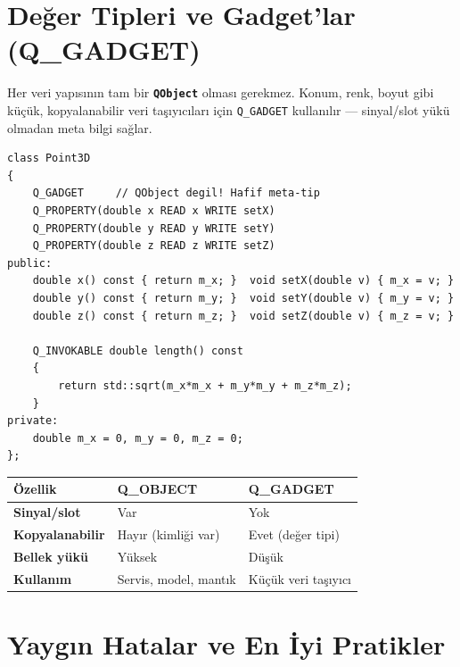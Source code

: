 \documentclass[11pt,a4paper]{article}
\newcommand{\kls}[1]{\texttt{\color{anaMavi}\textbf{#1}}}
\newcommand{\kod}[1]{\texttt{\color{koyuGri}#1}}
\begin{document}
\section{Değer Tipleri ve Gadget'lar (Q\_GADGET)}

Her veri yapısının tam bir \kls{QObject} olması gerekmez. Konum, renk, boyut
gibi küçük, kopyalanabilir veri taşıyıcıları için \kod{Q\_GADGET} kullanılır —
sinyal/slot yükü olmadan meta bilgi sağlar.

\begin{lstlisting}
class Point3D
{
    Q_GADGET     // QObject degil! Hafif meta-tip
    Q_PROPERTY(double x READ x WRITE setX)
    Q_PROPERTY(double y READ y WRITE setY)
    Q_PROPERTY(double z READ z WRITE setZ)
public:
    double x() const { return m_x; }  void setX(double v) { m_x = v; }
    double y() const { return m_y; }  void setY(double v) { m_y = v; }
    double z() const { return m_z; }  void setZ(double v) { m_z = v; }

    Q_INVOKABLE double length() const
    {
        return std::sqrt(m_x*m_x + m_y*m_y + m_z*m_z);
    }
private:
    double m_x = 0, m_y = 0, m_z = 0;
};
\end{lstlisting}

\begin{center}
\begin{tabularx}{\textwidth}{@{}>{\bfseries\color{anaMavi}}l >{\raggedright\arraybackslash}X >{\raggedright\arraybackslash}X@{}}
\toprule
\rowcolor{acikMavi}\color{anaMavi}\textbf{Özellik} & \color{anaMavi}\textbf{Q\_OBJECT} & \color{anaMavi}\textbf{Q\_GADGET} \\
\midrule
Sinyal/slot & Var & Yok \\
\rowcolor{acikGri} Kopyalanabilir & Hayır (kimliği var) & Evet (değer tipi) \\
Bellek yükü & Yüksek & Düşük \\
\rowcolor{acikGri} Kullanım & Servis, model, mantık & Küçük veri taşıyıcı \\
\bottomrule
\end{tabularx}
\end{center}

\section{Yaygın Hatalar ve En İyi Pratikler}
\end{document}
